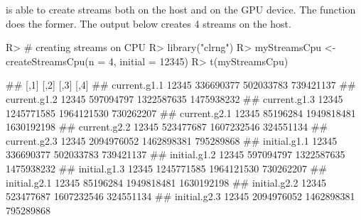 \documentclass[article,nojss]{jss}\usepackage[]{graphicx}\usepackage[]{color}
\newcommand{\fct}[1]{\code{#1()}}
\begin{document}
 is able to create streams both on the host and on the GPU device. The \fct{createStreamsCpu} function does the former. The  output below creates 4 streams on the host.
\begin{CodeChunk}
\begin{CodeInput}
R> # creating streams on CPU
R> library("clrng")
R> myStreamsCpu <- createStreamsCpu(n = 4, initial = 12345)
R> t(myStreamsCpu)
\end{CodeInput}
\begin{CodeOutput}
##               [,1]       [,2]       [,3]       [,4]
## current.g1.1 12345  336690377  502033783  739421137
## current.g1.2 12345  597094797 1322587635 1475938232
## current.g1.3 12345 1245771585 1964121530  730262207
## current.g2.1 12345   85196284 1949818481 1630192198
## current.g2.2 12345  523477687 1607232546  324551134
## current.g2.3 12345 2094976052 1462898381  795289868
## initial.g1.1 12345  336690377  502033783  739421137
## initial.g1.2 12345  597094797 1322587635 1475938232
## initial.g1.3 12345 1245771585 1964121530  730262207
## initial.g2.1 12345   85196284 1949818481 1630192198
## initial.g2.2 12345  523477687 1607232546  324551134
## initial.g2.3 12345 2094976052 1462898381  795289868
\end{CodeOutput} 
\end{CodeChunk} 
\end{document}
